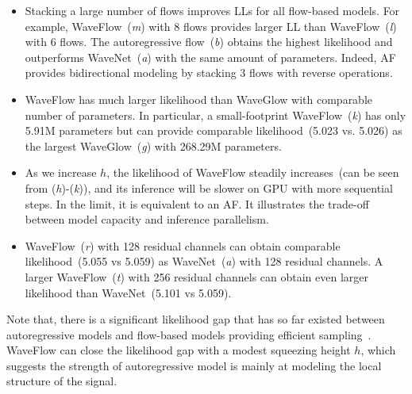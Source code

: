 \documentclass{article}
\begin{document}
\begin{itemize}[itemsep=0.00pt, topsep=0pt, leftmargin=1.25em]
    \vspace{-.2em}
    \item Stacking a large number of flows improves LLs for all flow-based models.
    For example, WaveFlow~(\emph{m}) with 8 flows provides larger LL than WaveFlow~(\emph{l}) with 6 flows.
    The autoregressive flow~(\emph{b}) obtains the highest likelihood and outperforms WaveNet~(\emph{a}) with the same amount of parameters. Indeed, AF provides bidirectional modeling by stacking 3 flows with reverse operations.
    \vspace{-.2em}
    \item WaveFlow has much larger likelihood than WaveGlow with comparable number of parameters.
     In particular, a small-footprint WaveFlow~(\emph{k}) has only 5.91M parameters but can provide comparable likelihood~(5.023 vs. 5.026) as the largest WaveGlow~(\emph{g}) with 268.29M parameters.
    \vspace{-.2em}
    \item As we increase $h$, the likelihood of WaveFlow steadily increases~(can be seen from (\emph{h})-(\emph{k})), and its inference will be slower on GPU with more sequential steps. In the limit, it is equivalent to an AF. It illustrates the trade-off between model capacity and inference parallelism.
    \vspace{-.2em}
    \item WaveFlow~(\emph{r}) with 128 residual channels can obtain comparable likelihood~(5.055 vs 5.059)  as WaveNet~(\emph{a}) with 128 residual channels.
    A larger WaveFlow~(\emph{t}) with 256 residual channels can obtain even larger likelihood than WaveNet~(5.101 vs 5.059).
    \vspace{-.1em}
\end{itemize}
Note that, there is a significant likelihood gap that has so far existed between autoregressive models and flow-based models providing efficient sampling~\citep[e.g.,][]{ho2019flow++, tran2019discrete}. WaveFlow can close the likelihood gap with a modest squeezing height $h$, which suggests the strength of autoregressive model is mainly at modeling the local structure of the signal.


\vspace{-.2em}
\end{document}
